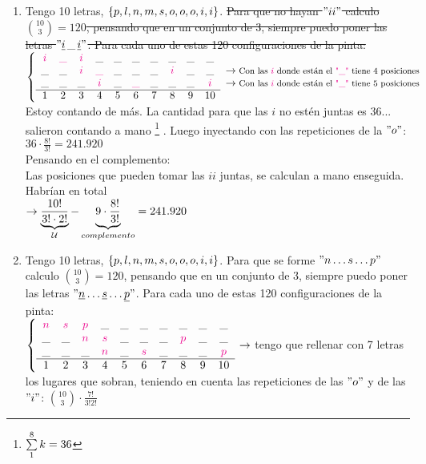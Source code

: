 \begin{enumerate}[label=\roman*)]
	\item
	      Tengo 10 letras, $\left\{ p,l,n,m,s,o,o,o,i,i \right\}$. \sout{Para que no hayan $"ii"$ calculo $\binom{10}{3} = 120$, pensando que en un conjunto de 3, siempre
		      puedo poner las letras $"\underline{i}\, \_ \, \underline{i} "$. Para cada uno de estas 120 configuraciones de la pinta:}  \\
	      $\llave{c c c c c c c c c c c} %
		      {
			      \magenta{i} & \magenta{\_} & \magenta{i} & \_ & \_ & \_ & \_ &\_ & \_ & \_\\
			      \_ & \_ & \magenta{i} & \magenta{\_} & \_ & \_ & \_ &\magenta{i} & \_ & \_ & \to \text{\footnotesize Con las \magenta{$i$} donde están el \magenta{"\_"} tiene 4 posiciones}\\
			      \_ & \_ & \_ & \magenta{i} & \_ & \magenta{\_} & \_ &\_ & \_ & \magenta{i}& \to \text{\footnotesize Con las \magenta{$i$} donde están el \magenta{"\_"} tiene 5 posiciones} \\ \cline{1-10}
			      1 & 2 & 3 & 4 & 5 & 6 & 7 & 8 & 9 & 10
		      } \\
	      $ Estoy contando de más. La cantidad para que las $i$ no estén juntas es 36... salieron contando a mano 
	      \footnote{$\sum\limits_{1}^{8} k = 36$}
	      .
	      Luego inyectando con las repeticiones de la $"o"$: $36 \cdot \frac{8!}{3!} = 241.920 $\\
        Pensando en el complemento:\\
	      Las posiciones que pueden tomar las $ii$ juntas, se calculan a mano enseguida. Habrían en total \\
        $\to \underbrace{\frac{10!}{3! \cdot 2!}}_\mathcal U - \underbrace{9 \cdot \frac{8!}{3!}}_{complemento} = 241.920 $


	\item
	      Tengo 10 letras, $\left\{ p,l,n,m,s,o,o,o,i,i \right\}$. Para que se forme  $"n\dots s \dots p"$ calculo $\binom{10}{3} = 120$, pensando que en un conjunto de 3, siempre
	      puedo poner las letras $"\underline{n}\dots \underline s \dots \underline{p} "$. Para cada uno de estas 120 configuraciones de la pinta: \\
	      $\llave{c c c c c c c c c c} %
		      {
			      \magenta{n} & \magenta{s} & \magenta{p} & \_ & \_ & \_ & \_ &\_ & \_ & \_\\
			      \_ & \_ & \magenta{n} & \magenta{s} & \_ & \_ & \_ &\magenta{p} & \_ & \_\\
			      \_ & \_ & \_ & \magenta{n} & \_ & \magenta{s} & \_ &\_ & \_ & \magenta{p}\\ \hline
			      1 & 2 & 3 & 4 & 5 & 6 & 7 & 8 & 9 & 10
		      } \to
	      $ tengo que rellenar con 7 letras los lugares que sobran, teniendo en cuenta las repeticiones de las $"o"$ y de las $"i"$:
	      $\binom{10}{3} \cdot \frac{7!}{3!2!}$
\end{enumerate}


